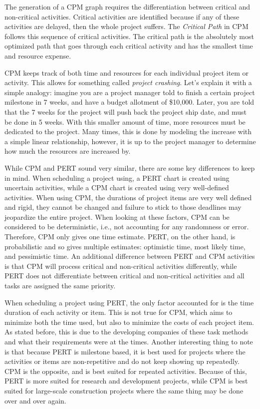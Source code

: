 \documentclass[12pt]{article}
\begin{document}
The generation of a CPM graph requires the differentiation between critical and non-critical activities.  Critical activities are identified because if any of these activities are delayed, then the whole project suffers.  The \textit{Critical Path} in CPM follows this sequence of critical activities.  The critical path is the absolutely most optimized path that goes through each critical activity and has the smallest time and resource expense.

CPM keeps track of both time and resources for each individual project item or activity.  This allows for something called \textit{project crashing}.  Let's explain it with a simple analogy: imagine you are a project manager told to finish a certain project milestone in 7 weeks, and have a budget allotment of \$10,000.  Later, you are told that the 7 weeks for the project will push back the project ship date, and must be done in 5 weeks.  With this smaller amount of time, more resources must be dedicated to the project.  Many times, this is done by modeling the increase with a simple linear relationship, however, it is up to the project manager to determine how much the resources are increased by.

While CPM and PERT sound very similar, there are some key differences to keep in mind.
When scheduling a project using, a PERT chart is created using uncertain activities, while a CPM chart is created using very well-defined activities.
When using CPM, the durations of project items are very well defined and rigid, they cannot be changed and failure to stick to those deadlines may jeopardize the entire project.
When looking at these factors, CPM can be considered to be deterministic, i.e., not accounting for any randomness or error.  Therefore, CPM only gives one time estimate.
PERT, on the other hand, is probabilistic and so gives multiple estimates: optimistic time, most likely time, and pessimistic time.  An additional difference between PERT and CPM activities is that CPM will process critical and non-critical activities differently, while PERT does not differentiate between critical and non-critical activities and all tasks are assigned the same priority.

When scheduling a project using PERT, the only factor accounted for is the time duration of each activity or item.  This is not true for CPM, which aims to minimize both the time used, but also to minimize the costs of each project item.  As stated before, this is due to the developing companies of these task methods and what their requirements were at the times.  Another interesting thing to note is that because PERT is milestone based, it is best used for projects where the activities or items are non-repetitive and do not keep showing up repeatedly.  CPM is the opposite, and is best suited for repeated activities. Because of this, PERT is more suited for research and development projects, while CPM is best suited for large-scale construction projects where the same thing may be done over and over again.
\end{document}
